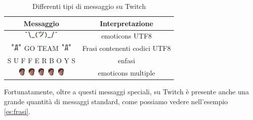\documentclass[a4paper,12pt,openright,twoside]{report}
\theoremstyle{definition}
\begin{document}
\begin{table}[h]
	\centering
	\begin{tabular}{|c|c|}
		\hline
		Messaggio & Interpretazione \\
		\hline
		\hline
		\includegraphics[height=0.4cm, width=2.0cm]{Immagini/Emoticons/sup.png}  & emoticons UTF8\\
		\hline
		\includegraphics[height=0.4cm, width=0.6cm]{Immagini/Emoticons/emo.png} GO TEAM \includegraphics[height=0.4cm, width=0.6cm]{Immagini/Emoticons/emo.png} & Frasi contenenti codici UTF8 \\
		\hline
		S U F F E R B O Y S & enfasi \\
		\hline
		\includegraphics[height=0.4cm, width=0.4cm]{Immagini/Emoticons/kappahd.png} \includegraphics[height=0.4cm, width=0.4cm]{Immagini/Emoticons/kappahd.png} \includegraphics[height=0.4cm, width=0.4cm]{Immagini/Emoticons/kappahd.png} \includegraphics[height=0.4cm, width=0.4cm]{Immagini/Emoticons/kappahd.png} \includegraphics[height=0.4cm, width=0.4cm]{Immagini/Emoticons/kappahd.png} & emoticons multiple \\
		\hline
	\end{tabular}
	\caption{Differenti tipi di messaggio su Twitch}
	\label{tab:messaggiTwitch}
\end{table}

Fortunatamente, oltre a questi messaggi speciali, su Twitch è
presente anche una grande quantità di messaggi standard, come possiamo vedere nell'esempio \ref{es:frasi}.
\end{document}
